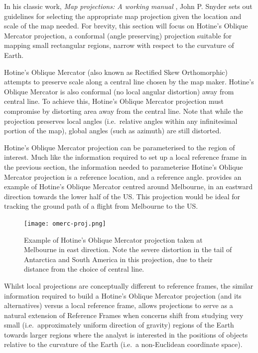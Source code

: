 In his classic work, \emph{Map projections: A working manual}
\cite{snyder_map_1987}, John P. Snyder sets out guidelines for
selecting the appropriate map projection given the location and scale of
the map needed. For brevity, this section will focus on Hotine's
Oblique Mercator projection, a conformal (angle preserving) projection
suitable for mapping small rectangular regions, narrow with respect to
the curvature of Earth.

Hotine's Oblique Mercator (also known as Rectified Skew Orthomorphic)
attempts to preserve scale along a central line chosen by the map maker.
Hotine's Oblique Mercator is also conformal (no local angular
distortion) away from central line. To achieve this, Hotine's Oblique
Mercator projection must compromise by distorting area away from the
central line. Note that while the projection preserves local angles
(i.e.~relative angles within any infinitesimal portion of the map),
global angles (such as azimuth) are still distorted.

Hotine's Oblique Mercator projection can be parameterised to the region
of interest. Much like the information required to set up a local
reference frame in the previous section, the information needed to
parameterise Hotine's Oblique Mercator projection is a reference
location, and a reference angle.  provides
an example of Hotine's Oblique Mercator centred around Melbourne, in an
eastward direction towards the lower half of the US. This projection
would be ideal for tracking the ground path of a flight from Melbourne
to the US.

\begin{figure}[htbp]
  \centering
  \texttt{[image: omerc-proj.png]}
  \caption{Example of Hotine's Oblique Mercator projection taken at Melbourne in east direction. Note the severe distortion in the tail of Antarctica and South America in this projection, due to their distance from the choice of central line.}
  \label{fig:omerc-proj}
\end{figure}

Whilst local projections are conceptually different to reference frames,
the similar information required to build a Hotine's
Oblique Mercator projection (and its alternatives) versus a local
reference frame, allows projections to serve as a natural extension of
Reference Frames when concerns shift from studying very small
(i.e.~approximately uniform direction of gravity) regions of the Earth
towards larger regions where the analyst is interested in the positions
of objects relative to the curvature of the Earth (i.e.~a non-Euclidean
coordinate space).

